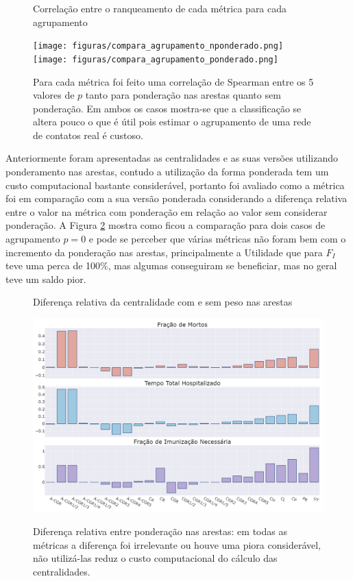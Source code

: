 \begin{figure}[H]
    \centering
    \captionsetup{font=normalsize,skip=0.8pt,singlelinecheck=on,labelsep=endash}
    \caption{Correlação entre o ranqueamento de cada métrica para cada agrupamento}
    
    \texttt{[image: figuras/compara\_agrupamento\_nponderado.png]}
    \\
    \texttt{[image: figuras/compara\_agrupamento\_ponderado.png]}
    \captionsetup{font=small,justification=justified}
    \caption*{Para cada métrica foi feito uma correlação de Spearman entre os 5 valores de $p$ tanto para ponderação nas arestas quanto sem ponderação. Em ambos os casos mostra-se que a classificação se altera pouco o que é útil pois estimar o agrupamento de uma rede de contatos real é custoso.}
    \label{fig:Spearman_p}
\end{figure}

Anteriormente foram apresentadas as centralidades e as suas versões utilizando ponderamento nas arestas, contudo a utilização da forma ponderada tem um custo computacional bastante considerável, portanto foi avaliado como a métrica foi em comparação com a sua versão ponderada considerando a diferença relativa entre o valor na métrica com ponderação em relação ao valor sem considerar ponderação. A Figura \ref{fig:compara_pesos} mostra como ficou a comparação para dois casos de agrupamento $p = 0$ e pode se perceber que várias métricas não foram bem com o incremento da ponderação nas arestas, principalmente a Utilidade que para $F_I$ teve uma perca de 100\%, mas algumas conseguiram se beneficiar, mas no geral teve um saldo pior.

\begin{figure}[H]
    \centering
    \captionsetup{font=normalsize,skip=0.8pt,singlelinecheck=on,labelsep=endash}
    \caption{Diferença relativa da centralidade com e sem peso nas arestas}
    
    \includegraphics[scale= 0.3]{figuras/compara_pesos_0.0.png}
    \\
    \captionsetup{font=small,justification=justified}
    \caption*{Diferença relativa entre ponderação nas arestas: em todas as métricas a diferença foi irrelevante ou houve uma piora considerável, não utilizá-las reduz o custo computacional do cálculo das centralidades.}
    \label{fig:compara_pesos}
\end{figure}

